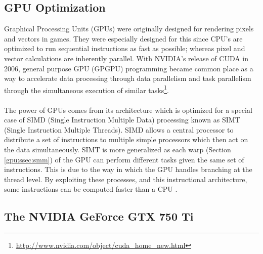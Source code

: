 \subsection{GPU Optimization}\label{gpu:sec:opt}
Graphical Processing Units (GPUs) were originally designed for rendering pixels and vectors in games. They were especially designed for this since CPU's are optimized to run sequential instructions as fast as possible; whereas pixel and vector calculations are inherently parallel. With NVIDIA's release of CUDA in 2006, general purpose GPU (GPGPU) programming became common place as a way to accelerate data processing through data parallelism and task parallelism through the simultaneous execution of similar tasks\footnote{\url{http://www.nvidia.com/object/cuda_home_new.html}}.
\\
\\
The power of GPUs comes from its architecture which is optimized for a special case of SIMD (Single Instruction Multiple Data) processing known as SIMT (Single Instruction Multiple Threads). SIMD allows a central processor to distribute a set of instructions to multiple simple processors which then act on the data simultaneously. SIMT is more generalized as each warp (Section \ref{gpu:ssec:smm}) of the GPU can perform different tasks given the same set of instructions. This is due to the way in which the GPU handles branching at the thread level. By exploiting these processes, and this instructional architecture, some instructions can be computed faster than a CPU \citep{vuduc2013brief}.
\subsection{The NVIDIA GeForce GTX 750 Ti}\label{gpu:sec:750}
%
